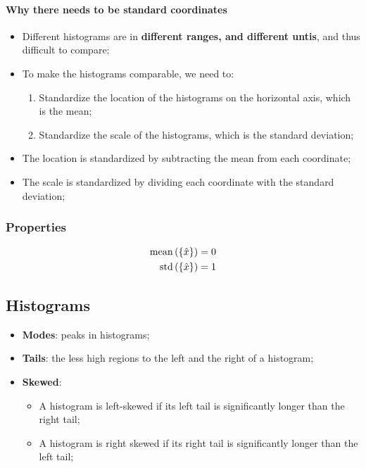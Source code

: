     \paragraph{Why there needs to be standard coordinates}
    \begin{itemize}
      \item Different histograms are in \textbf{different ranges, and different untis}, and thus difficult to compare;
      \item To make the histograms comparable, we need to:
      \begin{enumerate}
        \item Standardize the location of the histograms on the horizontal axis, which is the mean;
        \item Standardize the scale of the histograms, which is the standard deviation;
      \end{enumerate}
      
      \item The location is standardized by subtracting the mean from each coordinate;
      \item The scale is standardized by dividing each coordinate with the standard deviation;
    \end{itemize}
    
    \subsubsection{Properties}
    
      \begin{align}
        \operatorname{mean}\left( \{ \hat{x} \} \right) &= 0 \\
        \operatorname{std}\left( \{ \hat{x} \} \right) &= 1
      \end{align}
      
  \subsection{Histograms}
  
    \begin{itemize}
      \item \textbf{Modes}: peaks in histograms;
      \item \textbf{Tails}: the less high regions to the left and the right of a histogram;
      \item \textbf{Skewed}:
      \begin{itemize}
        \item A histogram is left-skewed if its left tail is significantly longer than the right tail;
        \item A histogram is right skewed if its right tail is significantly longer than the left tail;
      \end{itemize}
    \end{itemize}
    
